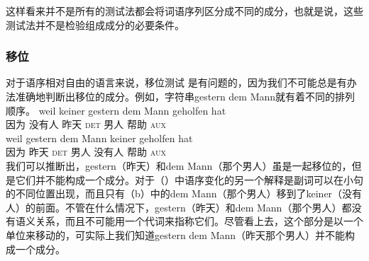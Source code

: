 这样看来并不是所有的测试法都会将词语序列区分成不同的成分，也就是说，这些测试法并不是检验组成成分的必要条件。

\subsubsection{移位}
对于语序相对自由的语言来说，移位测试 是有问题的，因为我们不可能总是有办法准确地判断出移位的成分。例如，字符串gestern dem Mann就有着不同的排列顺序。
\eal
\ex 
\gll weil keiner gestern dem Mann geholfen hat\\
     因为 没有人 昨天 \textsc{det} 男人 帮助 \textsc{aux}\\
\ex 
\gll weil gestern dem Mann keiner geholfen hat\\
	 因为 昨天 \textsc{det} 男人 没有人 帮助 \textsc{aux}\\
\zl
我们可以推断出，gestern（昨天）和dem Mann（那个男人）虽是一起移位的，但是它们并不能构成一个成分。对于（）中语序变化的另一个解释是副词可以在小句的不同位置出现，而且只有（b）中的dem Mann（那个男人）移到了keiner（没有人）的前面。不管在什么情况下，gestern（昨天）和dem Mann（那个男人）都没有语义关系，而且不可能用一个代词来指称它们。尽管看上去，这个部分是以一个单位来移动的，可实际上我们知道gestern dem Mann（昨天那个男人）并不能构成一个成分。

